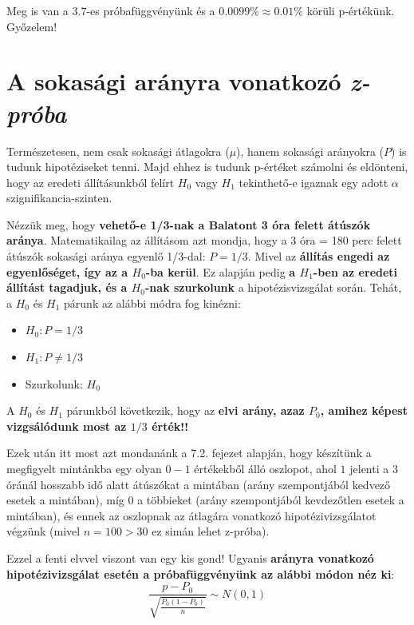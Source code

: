 \documentclass[
]{book}
\providecommand{\tightlist}{%
  \setlength{\itemsep}{0pt}\setlength{\parskip}{0pt}}
\begin{document}
Meg is van a \(3.7\)-es próbafüggvényünk és a \(0.0099\% \approx 0.01\%\) körüli p-értékünk. Győzelem!

\section{\texorpdfstring{A sokasági arányra vonatkozó \emph{z-próba}}{A sokasági arányra vonatkozó z-próba}}\label{a-sokasuxe1gi-aruxe1nyra-vonatkozuxf3-z-pruxf3ba}

Természetesen, nem csak sokasági átlagokra (\(\mu\)), hanem sokasági arányokra (\(P\)) is tudunk hipotéziseket tenni. Majd ehhez is tudunk p-értéket számolni és eldönteni, hogy az eredeti állításunkból felírt \(H_0\) vagy \(H_1\) tekinthető-e igaznak egy adott \(\alpha\) szignifikancia-szinten.

Nézzük meg, hogy \textbf{vehető-e 1/3-nak a Balatont 3 óra felett átúszók aránya}. Matematikailag az állításom azt mondja, hogy a 3 óra = 180 perc felett átúszók sokasági aránya egyenlő 1/3-dal: \(P = 1/3\). Mivel az \textbf{állítás engedi az egyenlőséget, így az a \(H_0\)-ba kerül}. Ez alapján pedig \textbf{a \(H_1\)-ben az eredeti állítást tagadjuk, és a \(H_0\)-nak szurkolunk} a hipotézisvizsgálat során. Tehát, a \(H_0\) és \(H_1\) párunk az alábbi módra fog kinézni:

\begin{itemize}
\tightlist
\item
  \(H_0:P=1/3\)
\item
  \(H_1:P\neq1/3\)
\item
  Szurkolunk: \(H_0\)
\end{itemize}

A \(H_0\) és \(H_1\) párunkból következik, hogy az \textbf{elvi arány, azaz \(P_0\), amihez képest vizgsálódunk most az \(1/3\) érték!!}

Ezek után itt most azt mondanánk a 7.2. fejezet alapján, hogy készítünk a megfigyelt mintánkba egy olyan \(0-1\) értékekből álló oszlopot, ahol \(1\) jelenti a 3 óránál hosszabb idő alatt átúszókat a mintában (arány szempontjából kedvező esetek a mintában), míg \(0\) a többieket (arány szempontjából kevdezőtlen esetek a mintában), és ennek az oszlopnak az átlagára vonatkozó hipotézivizsgálatot végzünk (mivel \(n=100 > 30\) ez simán lehet z-próba).

Ezzel a fenti elvvel viszont van egy kis gond! Ugyanis \textbf{arányra vonatkozó hipotézivizsgálat esetén a próbafüggvényünk az alábbi módon néz ki}: \[\frac{p-P_0}{\sqrt{\frac{P_0(1-P_0)}{n}}} \sim N(0,1)\]
\end{document}
